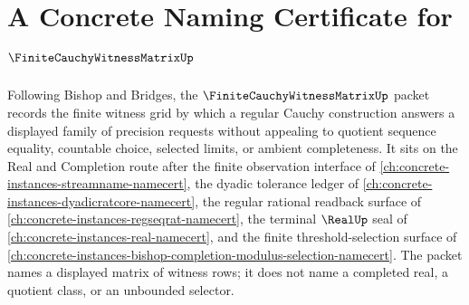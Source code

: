 \chapter{A Concrete Naming Certificate for $\FiniteCauchyWitnessMatrixUp$}
\label{ch:concrete-instances-finite-cauchy-witness-matrix-namecert}

Following Bishop and Bridges, the $\FiniteCauchyWitnessMatrixUp$ packet records the finite witness grid by which a regular Cauchy construction answers a displayed family of precision requests without appealing to quotient sequence equality, countable choice, selected limits, or ambient completeness. It sits on the Real and Completion route after the finite observation interface of \autoref{ch:concrete-instances-streamname-namecert}, the dyadic tolerance ledger of \autoref{ch:concrete-instances-dyadicratcore-namecert}, the regular rational readback surface of \autoref{ch:concrete-instances-regseqrat-namecert}, the terminal $\RealUp$ seal of \autoref{ch:concrete-instances-real-namecert}, and the finite threshold-selection surface of \autoref{ch:concrete-instances-bishop-completion-modulus-selection-namecert}. The packet names a displayed matrix of witness rows; it does not name a completed real, a quotient class, or an unbounded selector.

